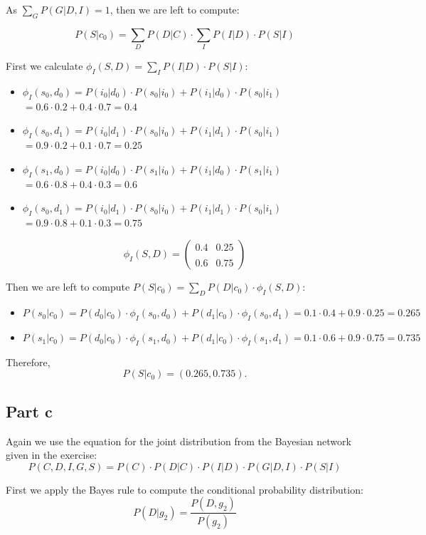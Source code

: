 \documentclass[11pt,a4paper]{article}
\begin{document}
	As $ \sum_{G}P(G|D,I) = 1$, then we are left to compute:
	
	$$ P(S|c_0) = \sum_{D} P(D|C) \cdot  \sum_{I}P(I|D)\cdot P(S|I)$$
	
	First we calculate $ \phi_I(S,D) = \sum_{I}P(I|D)\cdot P(S|I)$:
	\begin{itemize}
		\item $ \phi_I(s_0, d_0) = P(i_0|d_0) \cdot  P(s_0|i_0) + P(i_1|d_0) \cdot  P(s_0|i_1) $
		$ = 0.6\cdot 0.2 + 0.4\cdot 0.7 = 0.4 $
		\item $ \phi_I(s_0, d_1) = P(i_0|d_1) \cdot  P(s_0|i_0) + P(i_1|d_1) \cdot  P(s_0|i_1) $
		$ = 0.9\cdot 0.2 + 0.1\cdot 0.7 = 0.25 $
		\item $ \phi_I(s_1, d_0) = P(i_0|d_0) \cdot  P(s_1|i_0) + P(i_1|d_0) \cdot P(s_1|i_1) $
		$ = 0.6\cdot 0.8 + 0.4\cdot 0.3 = 0.6 $
		\item $ \phi_I(s_0,d_1) = P(i_0|d_1) \cdot  P(s_0|i_0) + P(i_1|d_1) \cdot P(s_0|i_1) $
		$ = 0.9\cdot 0.8 + 0.1\cdot 0.3 = 0.75 $
	\end{itemize}
	
	$$  \phi_I(S,D) =  \left(\begin{smallmatrix} 0.4 & 0.25 \\ \\ 0.6 & 0.75 \end{smallmatrix} \right) $$
	
	Then we are left to compute $ P(S|c_0) = \sum_{D}P(D|c_0) \cdot  \phi_I(S,D) :$
	\begin{itemize}
		\item $ P(s_0|c_0) = P(d_0|c_0)\cdot \phi_I(s_0,d_0) + P(d_1|c_0)\cdot \phi_I(s_0,d_1) = 0.1\cdot 0.4 + 0.9\cdot 0.25 = 0.265 $
		\item $ P(s_1|c_0) = P(d_0|c_0)\cdot \phi_I(s_1,d_0) + P(d_1|c_0)\cdot \phi_I(s_1,d_1)  = 0.1\cdot 0.6 + 0.9\cdot 0.75  = 0.735 $
	\end{itemize}
	
	Therefore, $$ P(S | c_0) = (0.265, 0.735). $$
	
	\subsection*{Part c}
	Again we use the equation for the joint distribution from the Bayesian network given in the exercise:
	$$ P(C,D,I,G,S) = P(C)\cdot P(D|C)\cdot P(I|D)\cdot P(G|D,I)\cdot P(S|I) $$
	
	First we apply the Bayes rule to compute the conditional probability distribution:
	$$ P(D | g_2) = \frac{P(D, g_2)}{P(g_2)} $$
	
\end{document}

